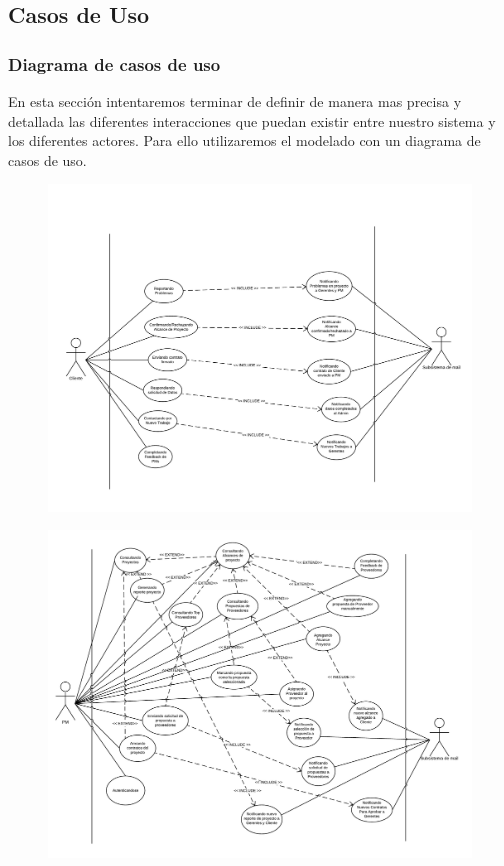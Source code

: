 \subsection{Casos de Uso}
	\subsubsection{Diagrama de casos de uso}
En esta sección intentaremos terminar de definir de manera mas precisa y detallada las diferentes interacciones que puedan existir entre nuestro sistema y los diferentes actores. Para ello utilizaremos el modelado con un diagrama de casos de uso.

\begin{figure}[H]
\includegraphics[width=\linewidth]{diag/viejos/cu1.pdf}
\end{figure}
\begin{figure}[H]
\includegraphics[width=\linewidth]{diag/viejos/cu2.pdf}
\end{figure}
